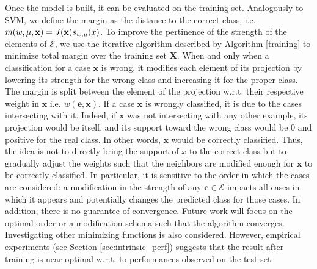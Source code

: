 \documentclass[preprint,12pt]{elsarticle}
\theoremstyle{definition}
\begin{document}
Once the model is built, it can be evaluated on the training set. Analogously to SVM, we define the margin as the distance to the correct class, i.e. $m(w, \mu, \mathbf x) = J(\mathbf x) s_{w,\mu}(\mathbf \mathbf x)$. To improve the pertinence of the strength of the elements of $\mathcal{E}$, we use the iterative algorithm described by Algorithm \ref{training} to minimize total margin over the training set $\mathbf X$.
When and only when a classification for a case $\mathbf x$ is wrong, it modifies each element of its projection by lowering its strength for the wrong class and increasing it for the proper class. The margin is split between the element of the projection w.r.t. their respective weight in $\mathbf x$ i.e. $w(\mathbf e, \mathbf x)$. If a case $\mathbf x$ is wrongly classified, it is due to the cases intersecting with it. Indeed, if $\mathbf x$ was not intersecting with any other example, its projection would be itself, and its support toward the wrong class would be 0 and positive for the real class. In other words, $\mathbf x$ would be correctly classified. Thus, the idea is not to directly bring the support of $x$ to the correct class but to gradually adjust the weights such that the neighbors are modified enough for $\mathbf x$ to be correctly classified. In particular, it is sensitive to the order in which the cases are considered: a modification in the strength of any $\mathbf e \in \mathcal{E}$ impacts all cases in which it appears and potentially changes the predicted class for those cases. In addition, there is no guarantee of convergence. Future work will focus on the optimal order or a modification schema such that the algorithm converges. Investigating other minimizing functions is also considered. However, empirical experiments (see Section \ref{sec:intrinsic_perf}) suggests that the result after training is near-optimal w.r.t. to performances observed on the test set.
\algrenewcommand\algorithmicindent{1.0em}%
\end{document}
